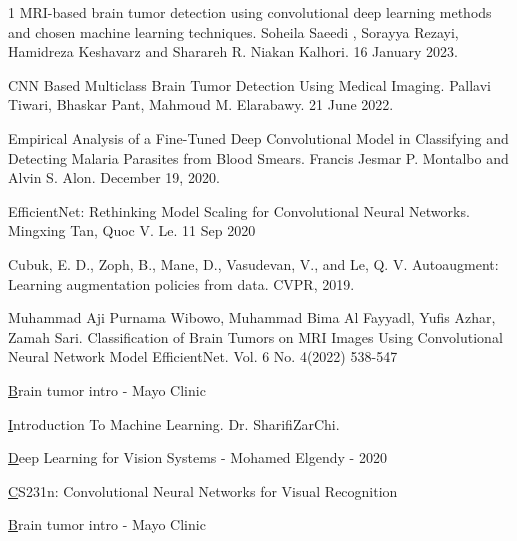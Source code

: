 \documentclass[12pt]{article}
\begin{document}
	
	\begin{thebibliography} {1} %
		MRI-based brain tumor detection using convolutional deep learning methods and chosen machine learning techniques. Soheila Saeedi
, Sorayya Rezayi, Hamidreza Keshavarz and Sharareh R. Niakan Kalhori. 16 January 2023.
		
		 CNN Based Multiclass Brain Tumor Detection Using Medical Imaging. Pallavi Tiwari, Bhaskar Pant, Mahmoud M. Elarabawy.  21 June 2022.
		
		Empirical Analysis of a Fine-Tuned Deep Convolutional Model in Classifying and Detecting Malaria Parasites from Blood Smears. Francis Jesmar P. Montalbo and Alvin S. Alon. December 19, 2020.
	
		 EfficientNet: Rethinking Model Scaling for Convolutional Neural Networks. Mingxing Tan, Quoc V. Le. 11 Sep 2020
		
		Cubuk, E. D., Zoph, B., Mane, D., Vasudevan, V., and Le,
Q. V. Autoaugment: Learning augmentation policies
from data. CVPR, 2019.
		
		Muhammad Aji Purnama Wibowo, Muhammad Bima Al Fayyadl, Yufis Azhar, Zamah Sari. Classification of Brain Tumors on MRI Images Using Convolutional Neural Network Model EfficientNet. Vol. 6 No. 4(2022) 538-547
		
		 \href{https://www.mayoclinic.org/diseases-conditions/brain-tumor/symptoms-causes/syc-20350084} Brain tumor intro - Mayo Clinic

	
	 \href{https://maktabkhooneh.org/}
	Introduction To Machine Learning. Dr. SharifiZarChi.
	
	 \href{https://www.oreilly.com/library/view/deep-learning-for/9781617296192/} Deep Learning for Vision Systems - Mohamed Elgendy - 2020 
	
	 \href{https://cs231n.github.io/} CS231n: Convolutional Neural Networks for Visual Recognition

		 \href{https://www.mayoclinic.org/diseases-conditions/brain-tumor/symptoms-causes/syc-20350084} Brain tumor intro - Mayo Clinic
	\end{thebibliography}
	
\end{document}
